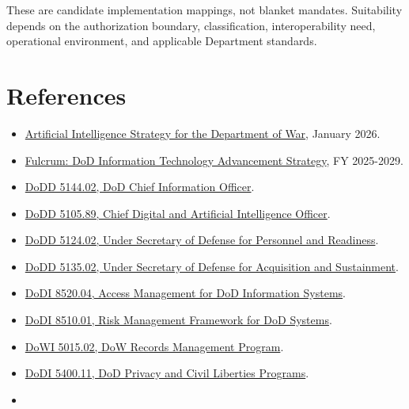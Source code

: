 \documentclass[11pt]{article}
\begin{document}
These are candidate implementation mappings, not blanket mandates.
Suitability depends on the authorization boundary, classification,
interoperability need, operational environment, and applicable
Department standards.

\hypertarget{references}{%
\section{References}\label{references}}

\begin{itemize}
\tightlist
\item
  \href{https://media.defense.gov/2026/Jan/12/2003855671/-1/-1/0/ARTIFICIAL-INTELLIGENCE-STRATEGY-FOR-THE-DEPARTMENT-OF-WAR.PDF}{Artificial
  Intelligence Strategy for the Department of War}, January 2026.
\item
  \href{https://dodcio.defense.gov/Portals/0/Documents/Library/FulcrumAdvStrat.pdf}{Fulcrum:
  DoD Information Technology Advancement Strategy}, FY 2025-2029.
\item
  \href{https://www.esd.whs.mil/Portals/54/Documents/DD/issuances/dodd/514402p.pdf}{DoDD
  5144.02, DoD Chief Information Officer}.
\item
  \href{https://www.esd.whs.mil/Portals/54/Documents/DD/issuances/dodd/510589p.PDF}{DoDD
  5105.89, Chief Digital and Artificial Intelligence Officer}.
\item
  \href{https://www.esd.whs.mil/Portals/54/Documents/DD/issuances/dodd/512402p.pdf}{DoDD
  5124.02, Under Secretary of Defense for Personnel and Readiness}.
\item
  \href{https://www.esd.whs.mil/Portals/54/Documents/DD/issuances/dodd/513502p.pdf}{DoDD
  5135.02, Under Secretary of Defense for Acquisition and Sustainment}.
\item
  \href{https://www.esd.whs.mil/Portals/54/Documents/DD/issuances/dodi/852004p.pdf}{DoDI
  8520.04, Access Management for DoD Information Systems}.
\item
  \href{https://www.esd.whs.mil/Portals/54/Documents/DD/issuances/dodi/851001p.pdf}{DoDI
  8510.01, Risk Management Framework for DoD Systems}.
\item
  \href{https://www.esd.whs.mil/Portals/54/Documents/DD/issuances/dodi/501502p.pdf}{DoWI
  5015.02, DoW Records Management Program}.
\item
  \href{https://www.esd.whs.mil/Portals/54/Documents/DD/issuances/dodi/540011p.pdf}{DoDI
  5400.11, DoD Privacy and Civil Liberties Programs}.
\item

\end{itemize}
\end{document}
